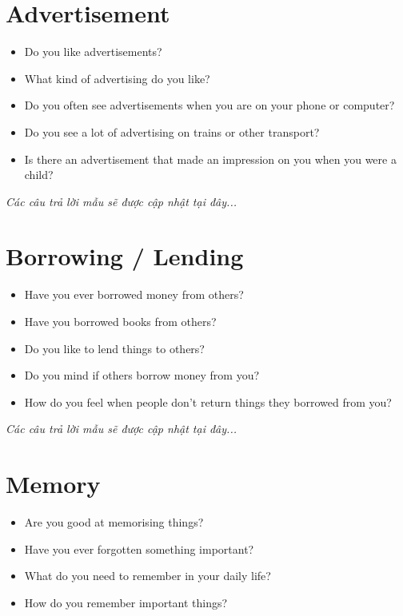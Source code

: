 \section{Advertisement}
\begin{ieltsprompt}
\begin{itemize}[itemsep=4pt]
    \item Do you like advertisements?
    \item What kind of advertising do you like?
    \item Do you often see advertisements when you are on your phone or computer?
    \item Do you see a lot of advertising on trains or other transport?
    \item Is there an advertisement that made an impression on you when you were a child?
\end{itemize}
\end{ieltsprompt}

\vspace{1em}
\textit{Các câu trả lời mẫu sẽ được cập nhật tại đây...}
\vspace{2em}

\section{Borrowing / Lending}
\begin{ieltsprompt}
\begin{itemize}[itemsep=4pt]
    \item Have you ever borrowed money from others?
    \item Have you borrowed books from others?
    \item Do you like to lend things to others?
    \item Do you mind if others borrow money from you?
    \item How do you feel when people don't return things they borrowed from you?
\end{itemize}
\end{ieltsprompt}

\vspace{1em}
\textit{Các câu trả lời mẫu sẽ được cập nhật tại đây...}
\vspace{2em}

\section{Memory}
\begin{ieltsprompt}
\begin{itemize}[itemsep=4pt]
    \item Are you good at memorising things?
    \item Have you ever forgotten something important?
    \item What do you need to remember in your daily life?
    \item How do you remember important things?
\end{itemize}
\end{ieltsprompt}

